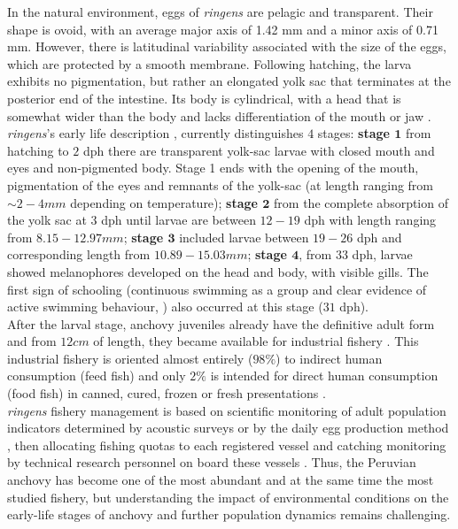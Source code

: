 In the natural environment, eggs of \textit{\gls{ringens}} are pelagic and transparent. Their shape is ovoid, with an average major axis of 1.42 mm and a minor axis of 0.71 mm. However, there is latitudinal variability associated with the size of the eggs, which are protected by a smooth membrane. Following hatching, the larva exhibits no pigmentation, but rather an elongated yolk sac that terminates at the posterior end of the intestine. Its body is cylindrical, with a head that is somewhat wider than the body and lacks differentiation of the mouth or jaw \citep{EinaRoja1963}. \textit{\gls{ringens}}’s early life description \citep{RiouOfel2021}, currently distinguishes $4$ stages: \textbf{stage $\mathbf{1}$} from hatching to $2$ \acrfull{dph} there are transparent yolk-sac larvae with closed mouth and eyes and non-pigmented body. Stage 1 ends with the opening of the mouth, pigmentation of the eyes and remnants of the yolk-sac (at length ranging from $\sim 2-4 mm$ depending on temperature); \textbf{stage $\mathbf{2}$} from the complete absorption of the yolk sac at $3$ \acrshort{dph} until larvae are between $12-19$ \acrshort{dph} with length ranging from $8.15-12.97mm$; \textbf{stage $\mathbf{3}$} included larvae between $19-26$ \acrshort{dph} and corresponding length from $10.89-15.03mm$; \textbf{stage $\mathbf{4}$}, from $33$ \acrshort{dph}, larvae showed melanophores developed on the head and body, with visible gills. The first sign of schooling (continuous swimming as a group and clear evidence of active swimming behaviour, \cite{Shaw1962}) also occurred at this stage ($31$ \acrshort{dph}).\\

After the larval stage, anchovy juveniles already have the definitive adult form and from $12 cm$ of length, they became available for industrial fishery \citep{MarzShin2009}. This industrial fishery is oriented almost entirely ($98 \%$) to indirect human consumption (feed fish) and only $2 \%$ is intended for direct human consumption (food fish) in canned, cured, frozen or fresh presentations \citep{FreoSuei2014}.\\

\textit{\gls{ringens}} fishery management is based on scientific monitoring of adult population indicators determined by acoustic surveys \citep{GutiSwar2007} or by the daily egg production method \citep{Ayon2000}, then allocating fishing quotas to each registered vessel and catching monitoring by technical research personnel on board these vessels \citep{KroeSanc2019}. Thus, the Peruvian anchovy has become one of the most abundant and at the same time the most studied fishery, but understanding the impact of environmental conditions on the early-life stages of anchovy and further population dynamics remains challenging.\\

